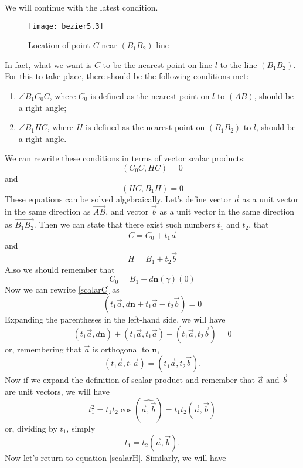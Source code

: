 \documentclass[12pt,a4paper]{article}
\newcommand{\vc}{\overrightarrow}
\begin{document}
We will continue with the latest condition.

\begin{figure}[h]
  \caption{Location of point $C$ near $(B_1B_2)$ line}
  \label{fig:nearest}
  \texttt{[image: bezier5.3]}
  \centering
\end{figure}

In fact, what we want is $C$ to be the nearest point on line $l$ to the line $(B_1B_2)$. For this to take place, there should be the following conditions met:
\begin{enumerate}
  \item $\angle B_1C_0C$, where $C_0$ is defined as the nearest point on $l$ to $(AB)$, should be a right angle;
  \item $\angle B_1HC$, where $H$ is defined as the nearest point on $(B_1B_2)$ to $l$, should be a right angle.
\end{enumerate}
We can rewrite these conditions in terms of vector scalar products:
\begin{equation}\label{scalarC}
(C_0C, HC) = 0
\end{equation}
and
\begin{equation}\label{scalarH}
(HC, B_1H) = 0
\end{equation}
These equations can be solved algebraically. Let's define vector $\vec a$ as a unit vector in the same direction as $\vc{AB}$, and vector $\vec b$ as a unit vector in the same direction as $\vc{B_1B_2}$. Then we can state that there exist such numbers $t_1$ and $t_2$, that
\begin{equation}\label{Cfromt1}
C = C_0 + t_1\vec{a}
\end{equation}
and
$$
H = B_1 + t_2\vec{b}
$$
Also we should remember that
$$
C_0 = B_1 + d\mathbf{n}(\gamma)(0)
$$
Now we can rewrite \eqref{scalarC} as
$$
(t_1\vec{a}, d\mathbf{n} + t_1\vec{a} - t_2\vec{b}) = 0
$$
Expanding the parentheses in the left-hand side, we will have
$$
  (t_1\vec{a}, d\mathbf{n}) + (t_1\vec{a}, t_1\vec{a}) - (t_1\vec{a}, t_2\vec{b}) = 0
$$
or, remembering that $\vec{a}$ is orthogonal to $\mathbf{n}$,
$$
(t_1\vec{a}, t_1\vec{a}) = (t_1\vec{a}, t_2\vec{b}).
$$
Now if we expand the definition of scalar product and remember that $\vec{a}$ and $\vec{b}$ are unit vectors, we will have
$$
t_1^2 = t_1t_2\cos(\widehat{\vec{a}, \vec{b}}) = t_1t_2(\vec{a}, \vec{b})
$$
or, dividing by $t_1$, simply
\begin{equation}\label{t1}
t_1 = t_2(\vec{a}, \vec{b}).
\end{equation}
Now let's return to equation \eqref{scalarH}. Similarly, we will have
\end{document}
